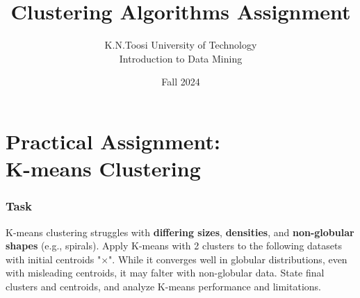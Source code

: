 \documentclass{article}
\begin{document}
	
	\title{Clustering Algorithms Assignment}
	\author{K.N.Toosi University of Technology\\Introduction to Data Mining}
	\date{Fall 2024}
	\maketitle
	\newpage
	\part{Practical Assignment:\\K-means Clustering}
			\section*{Task}
			K-means clustering struggles with \textbf{differing sizes}, \textbf{densities}, and \textbf{non-globular shapes} (e.g., spirals). Apply K-means with 2 clusters to the following datasets with initial centroids "$\times$". While it converges well in globular distributions, even with misleading centroids, it may falter with non-globular data. State final clusters and centroids, and analyze K-means performance and limitations.
\end{document}
